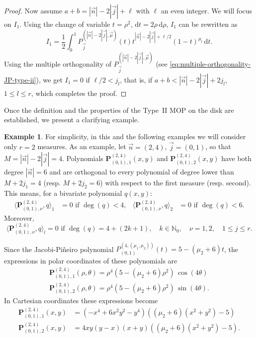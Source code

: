 \documentclass[a4paper]{article}
\theoremstyle{plain}
\theoremstyle{definition}
\newtheorem{example}[theorem]{Example}
\newcommand{\dr}{\mathrm{d}}
\begin{document}
\begin{proof}
        Now assume $a+b = |\vec n|-2|\vec j|+\ell $ with $\ell$ an even integer. We will focus on $I_1$. Using the change of variable $t=\rho^2$, $\dr t = 2\rho\,\dr \rho$, $I_1$ can be rewritten as
        $$
        I_1 = \frac 1 2 \int_0^1 P^{(|\vec n|-2|\vec j|, \vec \mu)}_{\vec j}(t)t^{|\vec n|-2|\vec j|+\ell/2}(1-t)^{\mu_l}\,\dr t.
        $$
        Using the multiple orthogonality of $P^{(|\vec n|-2|\vec j|, \vec \mu)}_{\vec j}$ (see \eqref{eq:multiple-orthogonality-JP-type-ii}), we get $I_1=0$ if $\ell/2< j_l$, that is, if $a+b<  |\vec n|-2|\vec j| + 2 j_l$, $1\leq l\leq r$, which completes the proof.
                
    \end{proof}

    Once the definition and the properties of the Type~II MOP on the disk are established, we present a clarifying example.

        \begin{example}
        For simplicity, in this and the following examples we will consider only $r=2$ measures. As an example, let $\vec n = (2,4)$, $\vec j = (0,1)$, so that $M=|\vec n|-2|\vec j| = 4$. Polynomials $\mathbf P^{(2,4)}_{(0,1),1}(x,y)$ and $\mathbf P^{(2,4)}_{(0,1),2}(x,y)$ have both degree $|\vec n|=6$ and are orthogonal to every polynomial of degree lower than $M+2j_1 = 4$ (resp. $M+2j_2 = 6$)  with respect to the first measure (resp. second). This means, for a bivariate polynomial $q(x,y)$:
        \begin{align*}
            \langle \mathbf P^{(2,4)}_{(0,1),\nu}, q\rangle_1 &= 0  \text{ if }\deg(q)<4, & 
            \langle \mathbf P^{(2,4)}_{(0,1),\nu}, q\rangle_2 &= 0  \text{ if }\deg(q)<6.             
        \end{align*}
        Moreover,
        $$
        \langle \mathbf P^{(2,4)}_{(0,1),\nu}, q\rangle_l = 0  \text{ if }\deg(q)=4+(2k+1), \quad k\in\mathbb N_0, \quad \nu=1,2, \quad 1\leq j\leq r.
        $$
        
        Since the Jacobi-Pi\~neiro polynomial $P^{(4,(\mu_1,\mu_2))}_{(0,1)}(t)=5-(\mu_2+6) t$, the expressions in polar coordinates of these polynomials are
        \begin{align*}
            \mathbf P^{(2,4)}_{(0,1),1}(\rho,\theta) =  \rho ^4  \left(5-(\mu_2+6) \rho ^2\right)\, \cos (4 \theta )\\
            \mathbf P^{(2,4)}_{(0,1),2}(\rho,\theta) =  \rho ^4  \left(5-(\mu_2+6) \rho ^2\right)\, \sin (4 \theta ).
        \end{align*}
        In Cartesian coordinates these expressions become
        \begin{align*}
            \mathbf P^{(2,4)}_{(0,1),1}(x,y)&=\left(-x^4+6 x^2 y^2-y^4\right) \left((\mu_2+6) \left(x^2+y^2\right)-5\right) \\
            \mathbf P^{(2,4)}_{(0,1),2}(x,y)&=4 x y (y-x) (x+y) \left((\mu_2+6) \left(x^2+y^2\right)-5\right).
        \end{align*}
    \end{example}
\end{document}
